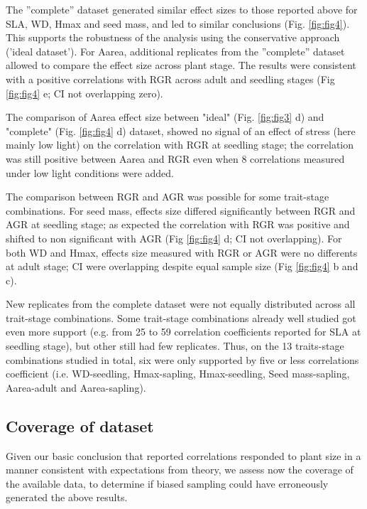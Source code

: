 \documentclass[a4paper,11pt]{article}
\begin{document}
The ''complete'' dataset generated similar effect sizes to those reported above for SLA, WD, Hmax and seed mass, and led to similar conclusions (Fig. \ref{fig:fig4}). This supports the robustness of the analysis using the conservative approach ('ideal dataset'). For Aarea, additional replicates from the ''complete'' dataset allowed to compare the effect size across plant stage. The results were consistent with a positive correlations with RGR across adult and seedling stages (Fig \ref{fig:fig4} e; CI not overlapping zero). 

The comparison of Aarea effect size between "ideal" (Fig. \ref{fig:fig3} d) and "complete" (Fig. \ref{fig:fig4} d) dataset, showed no signal of an effect of stress (here mainly low light) on the correlation with RGR at seedling stage; the correlation was still positive between Aarea and RGR even when 8 correlations measured under low light conditions were added. 

The comparison between RGR and AGR was possible for some trait-stage combinations. For seed mass, effects size differed significantly between RGR and AGR at seedling stage; as expected the correlation with RGR was positive and shifted to non significant with AGR (Fig \ref{fig:fig4} d; CI not overlapping). For both WD and Hmax, effects size measured with RGR or AGR were no differents at adult stage; CI were overlapping despite equal sample size (Fig \ref{fig:fig4} b and c).

New replicates from the complete dataset were not equally distributed across all trait-stage combinations. Some trait-stage combinations already well studied got even more support (e.g. from 25 to 59 correlation coefficients reported for SLA at seedling stage), but other still had few replicates. Thus, on the 13 traits-stage combinations studied in total, six were only supported by five or less correlations coefficient (i.e. WD-seedling, Hmax-sapling, Hmax-seedling, Seed mass-sapling, Aarea-adult and Aarea-sapling).

\subsection*{Coverage of dataset}

Given our basic conclusion that reported correlations responded to plant size in a manner consistent with expectations from theory, we assess now the coverage of the available data, to determine if biased sampling could have erroneously generated the above results.
\end{document}
